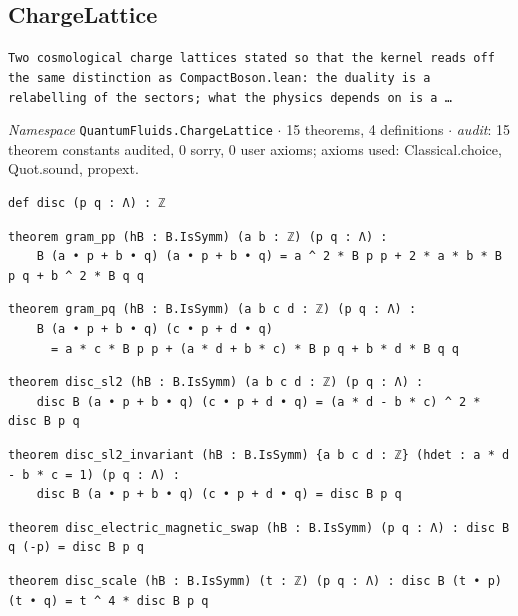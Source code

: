 \subsection{ChargeLattice}\label{appA:ChargeLattice}
{\footnotesize\raggedright\texttt{Two cosmological charge lattices stated so that the kernel reads off the same distinction as CompactBoson.\allowbreak{}lean: the duality is a relabelling of the sectors; what the physics depends on is a …}\par}
{\footnotesize\raggedright\emph{Namespace} \texttt{QuantumFluids.\allowbreak{}ChargeLattice} $\cdot$ 15 theorems, 4 definitions $\cdot$ \emph{audit}: 15 theorem constants audited, 0 sorry, 0 user axioms; axioms used: Classical.choice, Quot.sound, propext.\par}
\vspace{1pt}
\begin{lstlisting}[style=leancat]
def disc (p q : Λ) : ℤ
\end{lstlisting}

\begin{lstlisting}[style=leancat]
theorem gram_pp (hB : B.IsSymm) (a b : ℤ) (p q : Λ) :
    B (a • p + b • q) (a • p + b • q) = a ^ 2 * B p p + 2 * a * b * B p q + b ^ 2 * B q q
\end{lstlisting}

\begin{lstlisting}[style=leancat]
theorem gram_pq (hB : B.IsSymm) (a b c d : ℤ) (p q : Λ) :
    B (a • p + b • q) (c • p + d • q)
      = a * c * B p p + (a * d + b * c) * B p q + b * d * B q q
\end{lstlisting}

\begin{lstlisting}[style=leancat]
theorem disc_sl2 (hB : B.IsSymm) (a b c d : ℤ) (p q : Λ) :
    disc B (a • p + b • q) (c • p + d • q) = (a * d - b * c) ^ 2 * disc B p q
\end{lstlisting}

\begin{lstlisting}[style=leancat]
theorem disc_sl2_invariant (hB : B.IsSymm) {a b c d : ℤ} (hdet : a * d - b * c = 1) (p q : Λ) :
    disc B (a • p + b • q) (c • p + d • q) = disc B p q
\end{lstlisting}

\begin{lstlisting}[style=leancat]
theorem disc_electric_magnetic_swap (hB : B.IsSymm) (p q : Λ) : disc B q (-p) = disc B p q
\end{lstlisting}

\begin{lstlisting}[style=leancat]
theorem disc_scale (hB : B.IsSymm) (t : ℤ) (p q : Λ) : disc B (t • p) (t • q) = t ^ 4 * disc B p q
\end{lstlisting}


